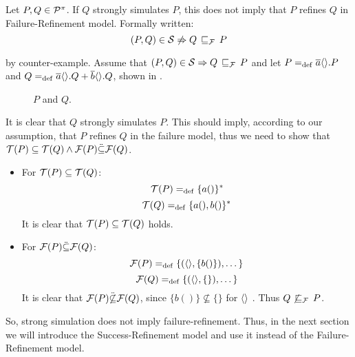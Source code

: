 \begin{rem}
\label{cor_sim_failure_refinement}
Let $P,Q\in\mathcal P^{\pi}$. If $Q$ strongly simulates $P$, this does not imply that $P$ refines $Q$ in Failure-Refinement model. Formally written:
    \[(P,Q)\in{}\simu  \not\Rightarrow Q \refiF P\]
\end{rem}%
\begin{prf}
by counter-example. Assume that $(P,Q)\in{}\simu \Rightarrow Q \refiF P$ and let $P=_{\mathrm{def}}\overline{a}\langle\rangle.P$ and $Q=_{\mathrm{def}}\overline{a}\langle\rangle.Q + \overline{b}\langle\rangle.Q$, shown in .
\begin{figure}[H]%
\centering
{}%
\qquad
{}%
\caption{$P$ and $Q$.}
\label{vm_and_vmHalf}
\end{figure}

It is clear that $Q$ strongly simulates $P$. This should imply, according to our assumption, that $P$ refines $Q$ in the failure model, thus we need to show that $\Traces[P]\subseteq\Traces[Q] \wedge \Failures[P]\ddot{\subseteq}\Failures[Q]$.
\begin{itemize}
\item For $\Traces[P]\subseteq\Traces[Q]$:
    \[\Traces[P] \define \{a()\}^\ast\]
    \[\Traces[Q] \define \{a(),b()\}^\ast\]
It is clear that $\Traces[P]\subseteq\Traces[Q]$ holds. 
\item For $\Failures[P]\ddot{\subseteq}\Failures[Q]$:
    \[\Failures[P] \define \{(\out{}{},\{b()\}),\dots\}\]
    \[\Failures[Q] \define \{(\out{}{},\{\}),\dots\}\]
It is clear that $\Failures[P]\ddot{\not\subseteq}\Failures[Q]$, since $\{b()\} \not\subseteq \{\}$ for $\overline{}\langle\rangle$ . Thus $Q \not\refiF P$.
\end{itemize}
So, strong simulation does not imply failure-refinement. Thus, in the next section we will introduce the Success-Refinement model and use it instead of the Failure-Refinement model.
\end{prf}